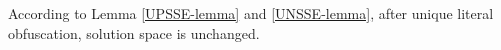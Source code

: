 \documentclass[conference]{IEEEtran}
\begin{document}
% 

According to Lemma \ref{UPSSE-lemma} and \ref{UNSSE-lemma},
after unique literal obfuscation, solution space is unchanged.
\end{document}
